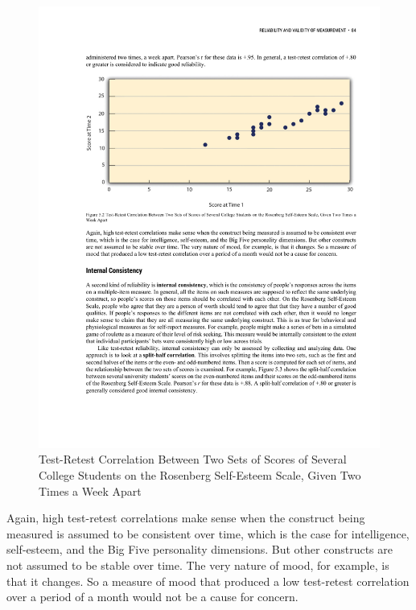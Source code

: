 \begin{figure}


      \includegraphics[width=\linewidth]{figures/C5testretest.pdf}


      \caption{Test-Retest Correlation Between Two Sets of Scores of Several College Students on the Rosenberg Self-Esteem Scale, Given Two Times a Week Apart}


      \label{fig:testretest}


\end{figure}



Again, high test-retest correlations make sense when the construct being measured is assumed to be consistent over time, which is the case for intelligence, self-esteem, and the Big Five personality dimensions. But other constructs are not assumed to be stable over time. The very nature of mood, for example, is that it changes. So a measure of mood that produced a low test-retest correlation over a period of a month would not be a cause for concern.


